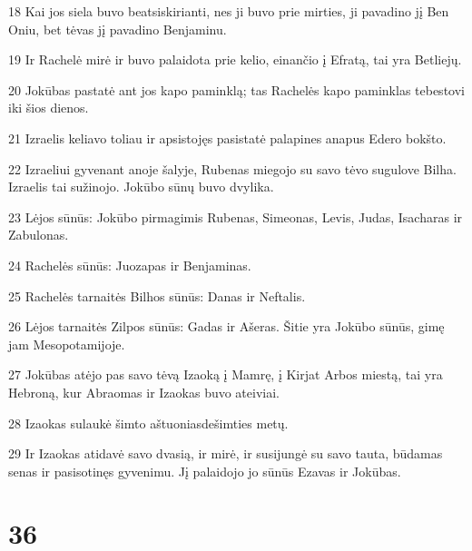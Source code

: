 \par 18 Kai jos siela buvo beatsiskirianti, nes ji buvo prie mirties, ji pavadino jį Ben Oniu, bet tėvas jį pavadino Benjaminu. 
\par 19 Ir Rachelė mirė ir buvo palaidota prie kelio, einančio į Efratą, tai yra Betliejų. 
\par 20 Jokūbas pastatė ant jos kapo paminklą; tas Rachelės kapo paminklas tebestovi iki šios dienos. 
\par 21 Izraelis keliavo toliau ir apsistojęs pasistatė palapines anapus Edero bokšto. 
\par 22 Izraeliui gyvenant anoje šalyje, Rubenas miegojo su savo tėvo sugulove Bilha. Izraelis tai sužinojo. Jokūbo sūnų buvo dvylika. 
\par 23 Lėjos sūnūs: Jokūbo pirmagimis Rubenas, Simeonas, Levis, Judas, Isacharas ir Zabulonas. 
\par 24 Rachelės sūnūs: Juozapas ir Benjaminas. 
\par 25 Rachelės tarnaitės Bilhos sūnūs: Danas ir Neftalis. 
\par 26 Lėjos tarnaitės Zilpos sūnūs: Gadas ir Ašeras. Šitie yra Jokūbo sūnūs, gimę jam Mesopotamijoje. 
\par 27 Jokūbas atėjo pas savo tėvą Izaoką į Mamrę, į Kirjat Arbos miestą, tai yra Hebroną, kur Abraomas ir Izaokas buvo ateiviai. 
\par 28 Izaokas sulaukė šimto aštuoniasdešimties metų. 
\par 29 Ir Izaokas atidavė savo dvasią, ir mirė, ir susijungė su savo tauta, būdamas senas ir pasisotinęs gyvenimu. Jį palaidojo jo sūnūs Ezavas ir Jokūbas.



\chapter{36}


